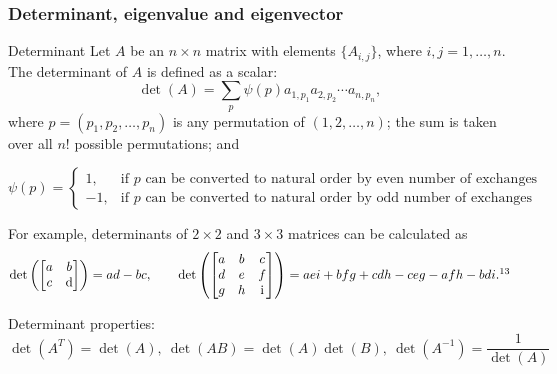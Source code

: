 \subsubsection{Determinant, eigenvalue and eigenvector}

\begin{concept}{Determinant}
Let \(A\) be an \(n\times n\) matrix with elements \(\{A_{i,j}\}\), where \(i,j=1,\ldots,n\). The determinant of \(A\) is defined as a scalar:
\[
\det(A)=\sum_p\psi(p)a_{1,p_1}a_{2,p_2}\cdots a_{n,p_n},
\]
where \(p=(p_1,p_2,\ldots,p_n)\) is any permutation of \((1,2,\ldots,n)\); the sum is taken over all \(n!\) possible permutations; and

\[
\psi(p)=\begin{cases}
1, & \text{if \(p\) can be converted to natural order by even number of exchanges}\\
-1, & \text{if \(p\) can be converted to natural order by odd number of exchanges}
\end{cases}
\]

For example, determinants of \(2\times2\) and \(3\times3\) matrices can be calculated as
\[
\det\left(\begin{bmatrix}a&b\\c&\dd\end{bmatrix}\right)=ad-bc,\qquad
\det\left(\begin{bmatrix}a&b&c\\d&e&f\\g&h&\ii\end{bmatrix}\right)=aei+bfg+cdh-ceg-afh-bdi.\footnotemark[13]
\]

Determinant properties: \(\det(A^T)=\det(A),\ \det(AB)=\det(A)\det(B),\ \det(A^{-1})=\dfrac{1}{\det(A)}\)
\end{concept}

